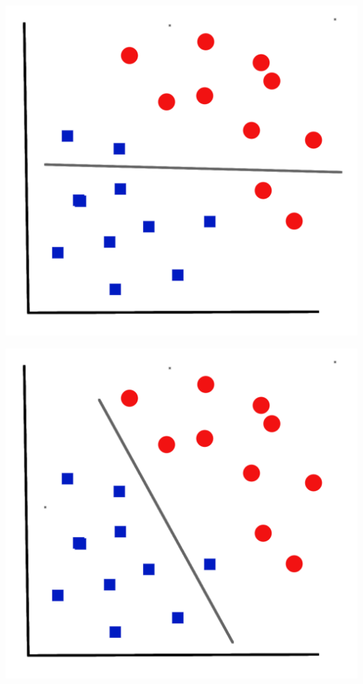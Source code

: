 \documentclass[aspectratio=169,xcolor=dvipsnames]{beamer}
\begin{document}
\begin{frame}
\begin{center}
\includegraphics[height=0.8\paperheight,keepaspectratio]{images/coordinates_points_3} 
\end{center}
\end{frame}

\begin{frame}
\begin{center}
\includegraphics[height=0.8\paperheight,keepaspectratio]{images/coordinates_points_4} 
\end{center}
\end{frame}
\end{document}

